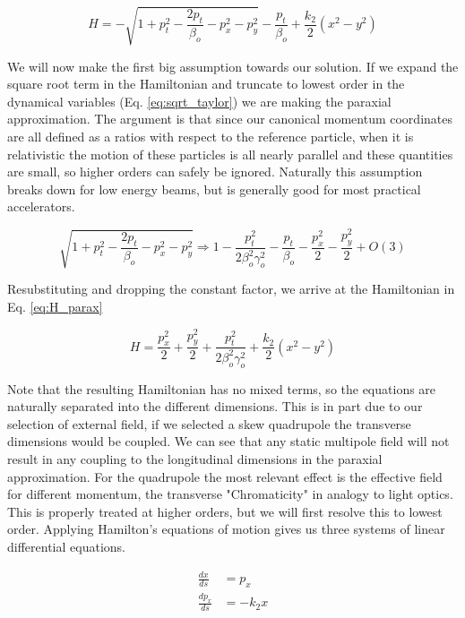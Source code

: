 \begin{equation} \label{eq:H_q}
	H = -\sqrt{1 + p_t^2 - \frac{2p_t}{\beta_o} - p_x^2 - p_y^2} - \frac{p_t}{\beta_o} + \frac{k_2}{2}(x^2 - y^2)
\end{equation}

We will now make the first big assumption towards our solution. If we expand the square root term in the Hamiltonian and truncate to lowest order in the dynamical variables (Eq. \ref{eq:sqrt_taylor}) we are making the paraxial approximation. The argument is that since our canonical momentum coordinates are all defined as a ratios with respect to the reference particle, when it is relativistic the motion of these particles is all nearly parallel and these quantities are small, so higher orders can safely be ignored. Naturally this assumption breaks down for low energy beams, but is generally good for most practical accelerators.

\begin{equation} \label{eq:sqrt_taylor}
	\sqrt{1 + p_t^2 - \frac{2p_t}{\beta_o} - p_x^2 - p_y^2} \Rightarrow 1 - \frac{p_t^2}{2\beta_o^2\gamma_o^2} - \frac{p_t}{\beta_o} - \frac{p_x^2}{2} - \frac{p_y^2}{2} + O(3)
\end{equation}

Resubstituting and dropping the constant factor, we arrive at the Hamiltonian in Eq. \ref{eq:H_parax}

\begin{equation} \label{eq:H_parax}
	H = \frac{p_x^2}{2} + \frac{p_y^2}{2} + \frac{p_t^2}{2\beta_o^2\gamma_o^2} + \frac{k_2}{2}(x^2 - y^2)
\end{equation}

Note that the resulting Hamiltonian has no mixed terms, so the equations are naturally separated into the different dimensions. This is in part due to our selection of external field, if we selected a skew quadrupole the transverse dimensions would be coupled. We can see that any static multipole field will not result in any coupling to the longitudinal dimensions in the paraxial approximation. For the quadrupole the most relevant effect is the effective field for different momentum, the transverse "Chromaticity" in analogy to light optics. This is properly treated at higher orders, but we will first resolve this to lowest order. Applying Hamilton's equations of motion gives us three systems of linear differential equations.

\begin{equation} \label{eq:quad_diffeq}
\begin{split}
	\frac{dx}{ds} &= p_x\\ 
	\frac{dp_x}{ds} &= -k_2 x
\end{split}
\end{equation}

